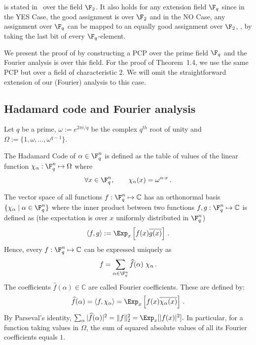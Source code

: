 \begin{remark}  is stated in~\cite{KhotPonnuswami} over the field $\F_2$. It also holds
for any extension field $\F_q$ since in the YES Case, the good assignment is over
$\F_2$ and in the NO Case, any assignment over $\F_q$ can be mapped
to an equally good assignment over $\F_2$, \eg, by taking the last bit of
every $\F_q$-element.
\end{remark}


\begin{remark} We present the proof of  by constructing a PCP over the prime field $\F_q$ and the Fourier analysis is over
this field. For the proof of Theorem~1.4, we use the same PCP but over
a field of characteristic $2$. We will omit the straightforward extension of our (Fourier) analysis to this case.
\end{remark}



\subsection{Hadamard code and Fourier analysis}

Let $q$ be a prime,   $\omega := e^{2\pi i/q}$ be the complex
$q^{th}$ root of unity and $\Omega := \{1, \omega, \ldots,
\omega^{q-1} \}$.

\begin{definition} 
%
%
The
%
Hadamard Code of $\alpha \in \F_q^n$ is defined
as the table of values of the linear function
 $\chi_\alpha: \F_q^n \mapsto \Omega$ where
  $$\forall x \in \F_q^n, \qquad  \chi_\alpha (x) = \omega^{\alpha \cdot  x}\,. $$
\end{definition}

The vector space of all functions $f : \F_q^n \mapsto {\mathbb C}$
has an orthonormal basis $\{ \chi_\alpha \mid \alpha \in \F_q^n\}$
where the inner product between two functions $f,g : \F_q^n \mapsto {\mathbb C}$ is defined as
(the expectation is over $x$ uniformly distributed in $\F_q^n$)
 $$ \left< f,g  \right> := \Exp_{x } \left[ f(x) \overline{g(x)}
 \right]\,. $$
Hence, every $f: \F_q^n \mapsto {\mathbb C}$ can be expressed
uniquely as
 $$ f = \sum_{\alpha \in \F_q^n}  \widehat{f}(\alpha) \ \chi_\alpha\,.
 $$
The coefficients $\widehat{f}(\alpha) \in {\mathbb C}$ are called
Fourier coefficients. These are defined by:
 $$ \widehat{f} (\alpha) = \left<f, \chi_\alpha \right> = \Exp_{x} \left[ f(x) \overline{\chi_\alpha(x)}
 \right]\,. $$
By Parseval's identity, $\sum_\alpha | \widehat{f}(\alpha)|^2
 = \| f\|_2^2 = \Exp_x [ |f(x)|^2]. $ In particular, for a function taking values in $\Omega$,
the sum of squared absolute values of all its Fourier coefficients equals $1$.


%
%
%
%


